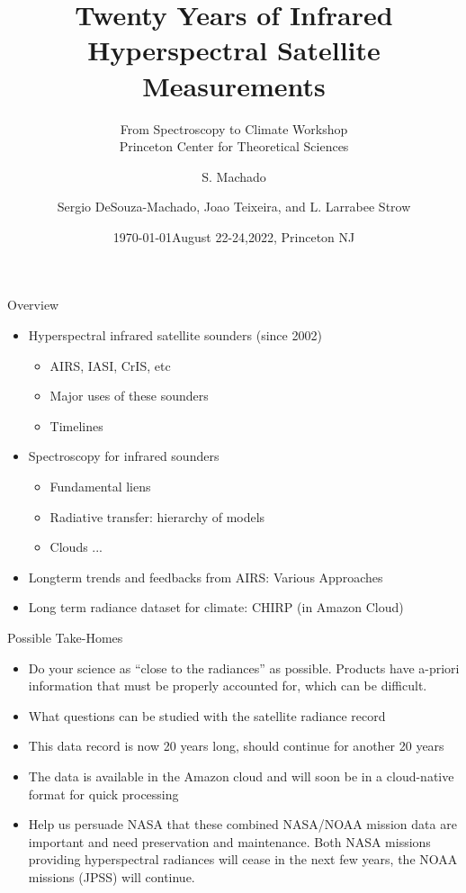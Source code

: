 \documentclass[10pt,t]{beamer}
\author{S. Machado}
\date{\today}
\title{\large Twenty Years of Infrared Hyperspectral Satellite Measurements}
\subtitle{\footnotesize{From Spectroscopy to Climate Workshop \\ \vspace{-0.07in} Princeton Center for Theoretical Sciences}}
\date{\vspace{0.1in}\footnotesize{August 22-24,2022, Princeton NJ \vfill}}
\author{Sergio DeSouza-Machado\inst{1}, Joao Teixeira\inst{2}, and L. Larrabee Strow\inst{1}}
\institute{\inst{1}UMBC Physics Department \and \inst{2}NASA Jet Propulsion Laboratory}
\begin{document}
\maketitle
\begin{frame}{Overview}
  \begin{itemize}
  \item Hyperspectral infrared satellite sounders (since 2002)
    \begin{itemize}
    \item AIRS, IASI, CrIS, etc
    \item Major uses of these sounders
    \item Timelines
    \end{itemize}
  \item Spectroscopy for infrared sounders
    \begin{itemize}
    \item Fundamental liens
    \item Radiative transfer: hierarchy of models
    \item Clouds ...
    \end{itemize}
  \end{itemize}
  \begin{itemize}
  \item Longterm trends and feedbacks from AIRS: Various Approaches
  \item Long term radiance dataset for climate: CHIRP (in Amazon Cloud)
  \end{itemize}
\end{frame}
\begin{frame}{Possible Take-Homes}
  \begin{itemize}
  \item Do your science as ``close to the radiances'' as possible.  Products have a-priori information that must be properly accounted for, which can be difficult.
  \item What questions can be studied with the satellite radiance record
  \item This data record is now 20 years long, should continue for another 20 years
  \item The data is available in the Amazon cloud and will soon be in a cloud-native format for quick processing
  \item Help us persuade NASA that these combined NASA/NOAA mission data are important and need preservation and maintenance.  Both NASA missions providing hyperspectral radiances will cease in the next few years, the NOAA missions (JPSS) will continue.
  \end{itemize} 
\end{frame}
\end{document}
